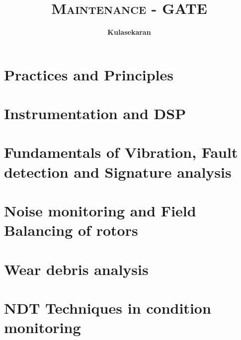 \documentclass[8pt]{report}
\title{\Huge{\textsc{Maintenance - GATE}}}
\author{\huge{\textbf{Kulasekaran}}}
\begin{document}
\maketitle
\tableofcontents
\chapter{Practices and Principles}
\chapter{Instrumentation and DSP}
\chapter{Fundamentals of Vibration, Fault detection and Signature analysis}
\chapter{Noise monitoring and Field Balancing of rotors}
\chapter{Wear debris analysis}
\chapter{NDT Techniques in condition monitoring}
\end{document}
